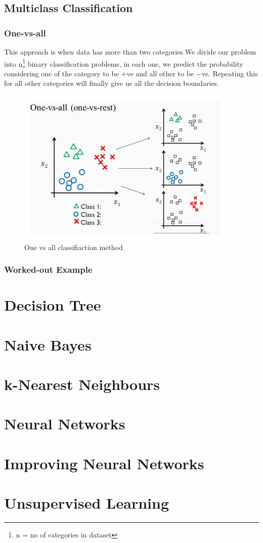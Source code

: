 \documentclass[12pt, A4]{report}
\begin{document}
\section{Multiclass Classification}
  \subsection{One-vs-all}
    This approach is when data has more than two categories.We divide our problem into n\footnote[1]{n = no of categories in dataset} binary classification problems, in each one, we predict the probability considering one of the category to be $+$ve and all other to be $-$ve. Repeating this for all other categories will finally give us all the decision boundaries.
    \begin{figure}[h]
      \centering
      \includegraphics[scale = 0.6]{oneall.png}
      \caption{One vs all classifiaction method}
    \end{figure}   

  \subsection{Worked-out Example}
	


\chapter{Decision Tree}


\chapter{Naive Bayes}


\chapter{k-Nearest Neighbours}


\chapter{Neural Networks}


\chapter{Improving Neural Networks}


\chapter{Unsupervised Learning}

\end{document}
